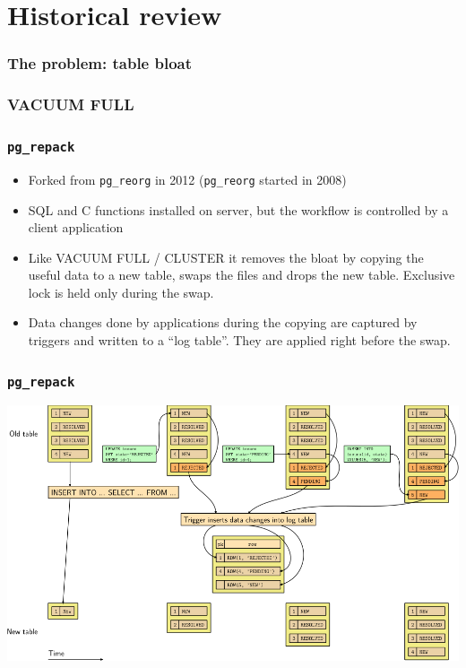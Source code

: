 \section{Historical review}

\begin{frame}
	\frametitle{The problem: table bloat}
\end{frame}

\begin{frame}
	\frametitle{VACUUM FULL}
\end{frame}

\begin{frame}
	\frametitle{\texttt{pg\_repack}}
  \begin{itemize}
    \item Forked from \texttt{pg\_reorg} in 2012 (\texttt{pg\_reorg} started
      in 2008)
    \item SQL and C functions installed on server, but the workflow is
      controlled by a client application
    \item Like VACUUM FULL / CLUSTER it removes the bloat by copying the
      useful data to a new table, swaps the files and drops the new
      table. Exclusive lock is held only during the swap.
    \item Data changes done by applications during the copying are captured by
      triggers and written to a ``log table''. They are applied right before
      the swap.
  \end{itemize}
\end{frame}

\begin{frame}
  \frametitle{\texttt{pg\_repack}}
  \begin{center}
\includegraphics[height=\sizeforimages\textheight]{pg_repack_01.png}
  \end{center}
\end{frame}

